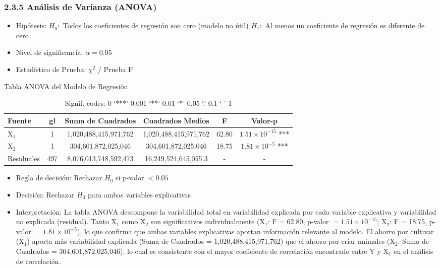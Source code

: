 \documentclass[12pt,a4paper]{article}
\begin{document}
\subsubsection*{2.3.5 Análisis de Varianza (ANOVA)}

\begin{itemize}
    \item Hipótesis: \quad $H_0:$ Todos los coeficientes de regresión son cero (modelo no útil) \hspace{1cm} $H_1:$ Al menos un coeficiente de regresión es diferente de cero
    \item Nivel de significancia: $\alpha = 0.05$
    \item Estadístico de Prueba: $\chi^2$ / Prueba F
\end{itemize}

\begin{table}[H]
\centering
\caption{Tabla ANOVA del Modelo de Regresión}
\label{tab:anova}
\begin{tabular}{|l|c|c|c|c|c|}
\hline
\textbf{Fuente} & \textbf{gl} & \textbf{Suma de Cuadrados} & \textbf{Cuadrados Medios} & \textbf{F} & \textbf{Valor-p} \\ \hline
X$_1$ & 1 & 1,020,488,415,971,762 & 1,020,488,415,971,762 & 62.80 & $1.51 \times 10^{-15}$ *** \\ \hline
X$_2$ & 1 & 304,601,872,025,046 & 304,601,872,025,046 & 18.75 & $1.81 \times 10^{-5}$ *** \\ \hline
Residuales & 497 & 8,076,013,748,592,473 & 16,249,524,645,055.3 & - & - \\ \hline
\end{tabular}
\caption*{Signif. codes: 0 `***' 0.001 `**' 0.01 `*' 0.05 `.' 0.1 ` ' 1}
\end{table}

\begin{itemize}
    \item Regla de decisión: Rechazar $H_0$ si p-valor $< 0.05$
    \item Decisión: Rechazar $H_0$ para ambas variables explicativas
    \item Interpretación: La tabla ANOVA descompone la variabilidad total en variabilidad explicada por cada variable explicativa y variabilidad no explicada (residual). Tanto X$_1$ como X$_2$ son significativos individualmente (X$_1$: F = 62.80, p-valor $= 1.51 \times 10^{-15}$; X$_2$: F = 18.75, p-valor $= 1.81 \times 10^{-5}$), lo que confirma que ambas variables explicativas aportan información relevante al modelo. El ahorro por cultivar (X$_1$) aporta más variabilidad explicada (Suma de Cuadrados = 1,020,488,415,971,762) que el ahorro por criar animales (X$_2$: Suma de Cuadrados = 304,601,872,025,046), lo cual es consistente con el mayor coeficiente de correlación encontrado entre Y y X$_1$ en el análisis de correlación.
\end{itemize}
\end{document}
